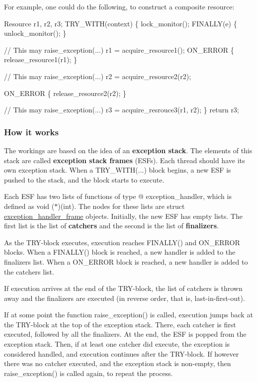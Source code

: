 For example, one could do the following, to construct a composite resource\+: 
\begin{DoxyCode}
Resource r1, r2, r3;
TRY\_WITH(context) \{
    lock\_monitor();
    FINALLY(e) \{
        unlock\_monitor();
    \}

    \textcolor{comment}{// This may raise\_exception(...)}
    r1 = acquire\_resource1();
    ON\_ERROR \{
        release\_resource1(r1);
    \}

    \textcolor{comment}{// This may raise\_exception(...)}
    r2 = acquire\_resource2(r2);

    ON\_ERROR \{
        release\_resource2(r2);
    \}
    
    \textcolor{comment}{// This may raise\_exception(...)}
    r3 = acquire\_resrouce3(r1, r2);
\}
\textcolor{keywordflow}{return} r3;
\end{DoxyCode}


\subsubsection*{How it works}

The workings are based on the idea of an {\bfseries exception stack}. The elements of this stack are called {\bfseries exception stack frames} (E\+S\+Fs). Each thread should have its own exception stack. When a T\+R\+Y\+\_\+\+W\+I\+TH(...) block begins, a new E\+SF is pushed to the stack, and the block starts to execute.

Each E\+SF has two lists of functions of type @ exception\+\_\+handler, which is defined as {\ttfamily void ($\ast$)(int)}. The nodes for these lists are {\ttfamily struct \hyperlink{structexception__handler__frame}{exception\+\_\+handler\+\_\+frame}} objects. Initially, the new E\+SF has empty lists. The first list is the list of {\bfseries catchers} and the second is the list of {\bfseries finalizers}.

As the T\+R\+Y-\/block executes, execution reaches {\ttfamily F\+I\+N\+A\+L\+L\+Y()} and {\ttfamily O\+N\+\_\+\+E\+R\+R\+OR} blocks. When a {\ttfamily F\+I\+N\+A\+L\+L\+Y()} block is reached, a new handler is added to the finalizers list. When a {\ttfamily O\+N\+\_\+\+E\+R\+R\+OR} block is reached, a new handler is added to the catchers list.

If execution arrives at the end of the T\+R\+Y-\/block, the list of catchers is thrown away and the finalizers are executed (in reverse order, that is, last-\/in-\/first-\/out).

If at some point the function {\ttfamily raise\+\_\+exception()} is called, execution jumps back at the T\+R\+Y-\/block at the top of the exception stack. There, each catcher is first executed, followed by all the finalizers. At the end, the E\+SF is popped from the exception stack. Then, if at least one catcher did execute, the exception is considered handled, and execution continues after the T\+R\+Y-\/block. If however there was no catcher executed, and the exception stack is non-\/empty, then {\ttfamily raise\+\_\+exception()} is called again, to repeat the process.

